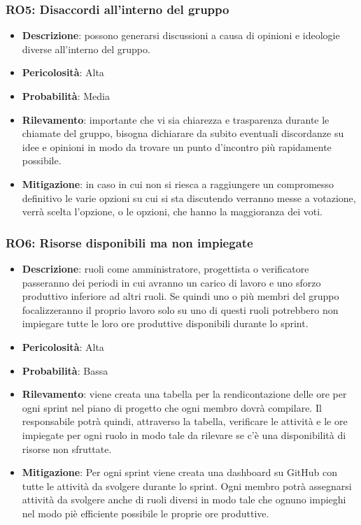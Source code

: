 \documentclass[a4paper, 12pt]{article}
\begin{document}
\subsubsection{RO5: Disaccordi all'interno del gruppo}
\begin{itemize}
    \item \textbf{Descrizione}: possono generarsi discussioni a causa di opinioni e ideologie diverse all'interno del gruppo.
    \item \textbf{Pericolosità}: Alta
    \item \textbf{Probabilità}: Media
    \item \textbf{Rilevamento}: importante che vi sia chiarezza e trasparenza durante le chiamate del gruppo, bisogna dichiarare da subito
    eventuali discordanze su idee e opinioni in modo da trovare un punto d'incontro più rapidamente possibile.
    \item \textbf{Mitigazione}: in caso in cui non si riesca a raggiungere un compromesso definitivo le varie opzioni su cui si sta discutendo verranno messe a votazione, verrà scelta l'opzione, o le opzioni, che hanno la maggioranza dei voti. 
\end{itemize}
\subsubsection{RO6: Risorse disponibili ma non impiegate}
\begin{itemize}
    \item \textbf{Descrizione}: ruoli come amministratore, progettista o verificatore passeranno dei periodi in cui avranno un carico 
    di lavoro e uno sforzo produttivo inferiore ad altri ruoli. Se quindi uno o più membri del gruppo focalizzeranno il proprio lavoro solo
    su uno di questi ruoli potrebbero non impiegare tutte le loro ore produttive disponibili durante lo sprint.
    \item \textbf{Pericolosità}: Alta
    \item \textbf{Probabilità}: Bassa
    \item \textbf{Rilevamento}: viene creata una tabella per la rendicontazione delle ore per ogni sprint nel piano di progetto che ogni membro dovrà compilare.
    Il responsabile potrà quindi, attraverso la tabella, verificare le attività e le ore impiegate per ogni ruolo in modo tale da rilevare se c'è una disponibilità di risorse non sfruttate.
    \item \textbf{Mitigazione}:  Per ogni sprint viene creata una dashboard su GitHub con tutte le attività da svolgere durante lo sprint.
    Ogni membro potrà assegnarsi attività da svolgere anche di ruoli diversi in modo tale che ognuno impieghi nel modo piè efficiente possibile le proprie ore produttive.
\end{itemize}
\end{document}
